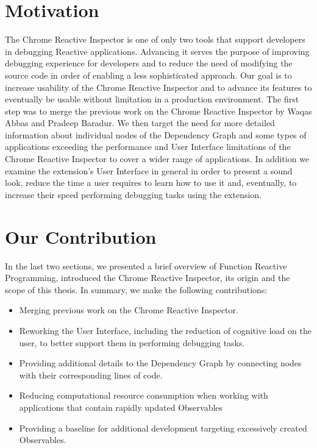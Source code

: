 \section{Motivation}
The Chrome Reactive Inspector is one of only two tools that support developers in debugging Reactive applications. Advancing it serves the purpose of improving debugging experience for developers and to reduce the need of modifying the source code in order of enabling a less sophisticated approach. Our goal is to increase usability of the Chrome Reactive Inspector and to advance its features to eventually be usable without limitation in a production environment. The first step was to merge the previous work on the Chrome Reactive Inspector by Waqas Abbas and Pradeep Baradur. We then target the need for more detailed information about individual nodes of the Dependency Graph and some types of applications exceeding the performance and User Interface limitations of the Chrome Reactive Inspector to cover a wider range of applications. In addition we examine the extension's User Interface in general in order to present a sound look, reduce the time a user requires to learn how to use it and, eventually, to increase their speed performing debugging tasks using the extension.


\section{Our Contribution}

In the last two sections, we presented a brief overview of Function Reactive Programming, introduced the Chrome Reactive Inspector, its origin and the scope of this thesis.
In summary, we make the following contributions:

\begin{itemize}
	\item Merging previous work on the Chrome Reactive Inspector.
	\item Reworking the User Interface, including the reduction of cognitive load on the user, to better support them in performing debugging tasks.
	\item Providing additional details to the Dependency Graph by connecting nodes with their corresponding lines of code.
	\item Reducing computational resource consumption when working with applications that contain rapidly updated Observables
	\item Providing a baseline for additional development targeting excessively created Observables.
\end{itemize}

